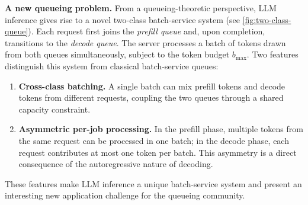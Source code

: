 \documentclass[11pt]{article}
\theoremstyle{plain}
\theoremstyle{definition}
\theoremstyle{remark}
\begin{document}
\textbf{A new queueing problem.}
From a queueing-theoretic perspective, LLM inference gives rise to a novel two-class batch-service system (see \cref{fig:two-class-queue}). Each request first joins the \emph{prefill queue} and, upon completion, transitions to the \emph{decode queue}. The server processes a batch of tokens drawn from both queues simultaneously, subject to the token budget $b_{\max}$. Two features distinguish this system from classical batch-service queues:
\begin{enumerate}
    \item \textbf{Cross-class batching.} A single batch can mix prefill tokens and decode tokens from different requests, coupling the two queues through a shared capacity constraint.
    \item \textbf{Asymmetric per-job processing.} In the prefill phase, multiple tokens from the same request can be processed in one batch; in the decode phase, each request contributes at most one token per batch. This asymmetry is a direct consequence of the autoregressive nature of decoding.
\end{enumerate}
These features make LLM inference a unique batch-service system and present an interesting new application challenge for the queueing community.
\end{document}
